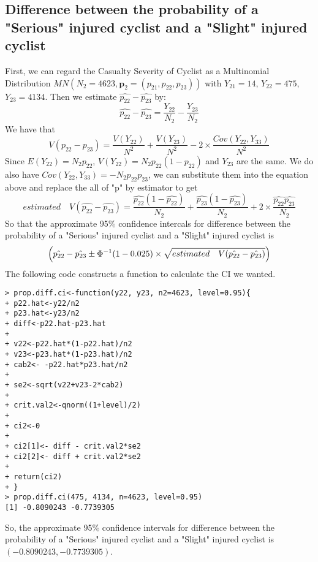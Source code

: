 \documentclass[12pt]{article}
\begin{document}
\subsection{Difference between the probability of a "Serious" injured cyclist and a "Slight" injured cyclist}
First, we can regard the Casualty Severity of Cyclist as a Multinomial Distribution $MN ( N_2 = 4623, \textbf{p}_2 = ( p_{21}, p_{22}, p_{23}))$ with $Y_{21} = 14$, $Y_{22} = 475$, $Y_{23} = 4134$.
Then we estimate $\hat{p_{22}} - \hat{p_{23}}$ by: \[\hat{p_{22}} - \hat{p_{23}} = \frac{Y_{22}}{N_2} - \frac{Y_{23}}{N_2}\]We have that \[V(p_{22}-p_{23}) = \frac{V(Y_{22})}{N^2} + \frac{V(Y_{23})}{N^2} - 2 \times \frac{Cov(Y_{22}, Y_{33})}{N^2}\]Since $E(Y_{22}) = N_2p_{22}$, $V(Y_{22})=N_2p_{22}(1-p_{22})$ and $Y_{23}$ are the same. We do also have $Cov(Y_{22}, Y_{33})=-N_2p_{22}p_{23}$, we can substitute them into the equation above and replace the all of "p" by estimator to get\[estimated \quad  V(\hat{p_{22}}-\hat{p_{23}})=\frac{\hat{p_{22}}(1-\hat{p_{22}})}{N_2}+\frac{\hat{p_{23}}(1-\hat{p_{23}})}{N_2}+2 \times \frac{\hat{p_{22}}\hat{p_{23}}}{N_2}\]
So that the approximate 95\% confidence intercals for difference between the probability of a "Serious" injured cyclist and a "Slight" injured cyclist is \[\Bigl(\hat{p_{22}}-\hat{p_{23}}\pm \Phi^{-1}(1-0.025) \times \sqrt{estimated \quad  V(\hat{p_{22}}-\hat{p_{23}})}\Bigl)\]
The following code constructs a function to calculate the CI we wanted.
\begin{verbatim}
> prop.diff.ci<-function(y22, y23, n2=4623, level=0.95){
+ p22.hat<-y22/n2
+ p23.hat<-y23/n2
+ diff<-p22.hat-p23.hat
+ 
+ v22<-p22.hat*(1-p22.hat)/n2
+ v23<-p23.hat*(1-p23.hat)/n2
+ cab2<- -p22.hat*p23.hat/n2
+ 
+ se2<-sqrt(v22+v23-2*cab2)
+ 
+ crit.val2<-qnorm((1+level)/2)
+ 
+ ci2<-0
+ 
+ ci2[1]<- diff - crit.val2*se2
+ ci2[2]<- diff + crit.val2*se2
+ 
+ return(ci2)
+ }
> prop.diff.ci(475, 4134, n=4623, level=0.95)
[1] -0.8090243 -0.7739305
\end{verbatim} 

\bigskip
\noindent
So, the approximate 95\% confidence intervals for difference between the probability of a "Serious" injured cyclist and a "Slight" injured cyclist is $(-0.8090243, -0.7739305)$.



















































       
\end{document}
